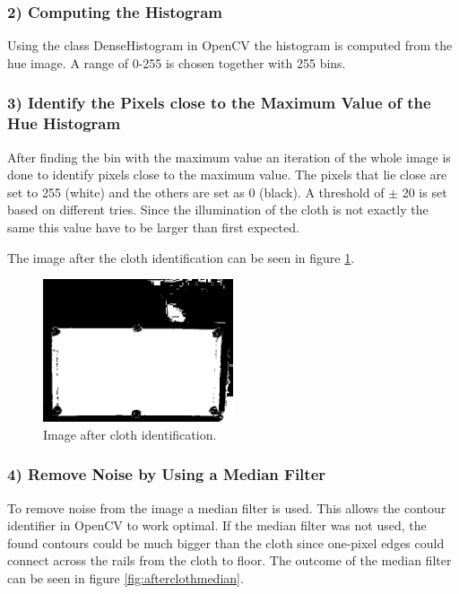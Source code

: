 \subsubsection{2) Computing the Histogram}
Using the class DenseHistogram in OpenCV the histogram is computed from the hue image. A range of 0-255 is chosen together with 255 bins.

\subsubsection{3) Identify the Pixels close to the Maximum Value of the Hue Histogram}
After finding the bin with the maximum value an iteration of the whole image is done to identify pixels close to the maximum value. The pixels that lie close are set to 255 (white) and the others are set as 0 (black). A threshold of $\pm$ 20 is set based on different tries. Since the illumination of the cloth is not exactly the same this value have to be larger than first expected.

The image after the cloth identification can be seen in figure \ref{fig:aftercloth}.

\begin{figure}[H]
\begin{center}
\leavevmode
\includegraphics[width=0.5\textwidth]{images/aftercloth}
\end{center}
\caption{Image after cloth identification.}
\label{fig:aftercloth}
\end{figure}

\subsubsection{4) Remove Noise by Using a Median Filter}
To remove noise from the image a median filter is used. This allows the contour identifier in OpenCV to work optimal. If the median filter was not used, the found contours could be much bigger than the cloth since one-pixel edges could connect across the rails from the cloth to floor. The outcome of the median filter can be seen in figure \ref{fig:afterclothmedian}.

